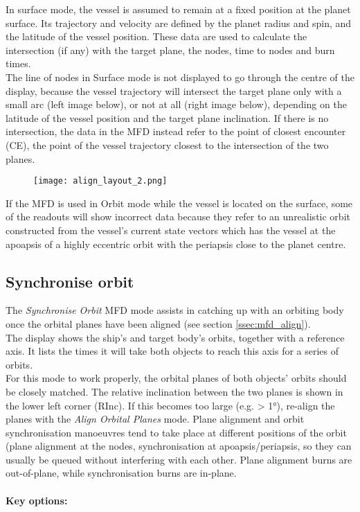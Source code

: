\documentclass[Orbiter User Manual.tex]{subfiles}
\begin{document}
\noindent
In surface mode, the vessel is assumed to remain at a fixed position at the planet surface. Its trajectory and velocity are defined by the planet radius and spin, and the latitude of the vessel position. These data are used to calculate the intersection (if any) with the target plane, the nodes, time to nodes and burn times.\\
The line of nodes in Surface mode is not displayed to go through the centre of the display, because the vessel trajectory will intersect the target plane only with a small arc (left image below), or not at all (right image below), depending on the latitude of the vessel position and the target plane inclination. If there is no intersection, the data in the MFD instead refer to the point of closest encounter (CE), the point of the vessel trajectory closest to the intersection of the two planes.

\begin{figure}[H]
  \centering
  \texttt{[image: align\_layout\_2.png]}
\end{figure}

\noindent
If the MFD is used in Orbit mode while the vessel is located on the surface, some of the readouts will show incorrect data because they refer to an unrealistic orbit constructed from the vessel's current state vectors which has the vessel at the apoapsis of a highly eccentric orbit with the periapsis close to the planet centre.


\subsection{Synchronise orbit}
The \textit{Synchronise Orbit} MFD mode assists in catching up with an orbiting body once the orbital planes have been aligned (see section \ref{ssec:mfd_align}).\\
The display shows the ship's and target body's orbits, together with a reference axis. It lists the times it will take both objects to reach this axis for a series of orbits.\\
For this mode to work properly, the orbital planes of both objects' orbits should be closely matched. The relative inclination between the two planes is shown in the lower left corner (RInc). If this becomes too large (e.g. > 1°), re-align the planes with the \textit{Align Orbital Planes} mode. Plane alignment and orbit synchronisation manoeuvres tend to take place at different positions of the orbit (plane alignment at the nodes, synchronisation at apoapsis/periapsis, so they can usually be queued without interfering with each other. Plane alignment burns are out-of-plane, while synchronisation burns are in-plane.\\
\\
\textbf{Key options:}
\end{document}
